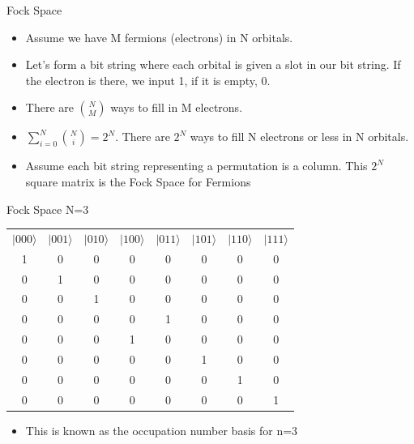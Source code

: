 \begin{frame}{Fock Space}
    \begin{itemize}
        \item Assume we have M fermions (electrons) in N orbitals. 
        \item Let's form a bit string where each orbital is given a slot in our bit string. If the electron is there, we input 1, if it is empty, 0.
        \item There are $\binom{N}{M}$ ways to fill in M electrons.
        \item$\sum_{i=0}^N{\binom{N}{i}} = 2^N$. There are $2^N$ ways to fill N electrons or less in N orbitals.
        \item Assume each bit string representing a permutation is a column. This $2^N$ square matrix is the Fock Space for Fermions
    \end{itemize}
\end{frame}
\begin{frame}{Fock Space N=3}
    \centering \begin{tabular}{c|c|c|c|c|c|c|c}
         $|000\rangle$ & $|001\rangle$ & $|010\rangle$ & $|100\rangle$ & $|011\rangle$ & $|101\rangle$ & $|110\rangle$ & $|111\rangle$\\
         1 & 0 & 0 & 0 & 0 & 0 & 0 & 0 \\
         0 & 1 & 0 & 0 & 0 & 0 & 0 & 0 \\
         0 & 0 & 1 & 0 & 0 & 0 & 0 & 0 \\
         0 & 0 & 0 & 0 & 1 & 0 & 0 & 0 \\
         0 & 0 & 0 & 1 & 0 & 0 & 0 & 0 \\
         0 & 0 & 0 & 0 & 0 & 1 & 0 & 0 \\
         0 & 0 & 0 & 0 & 0 & 0 & 1 & 0 \\
         0 & 0 & 0 & 0 & 0 & 0 & 0 & 1 \\
    \end{tabular}
    \begin{itemize}
        \item This is known as the occupation number basis for n=3
    \end{itemize}
\end{frame}

